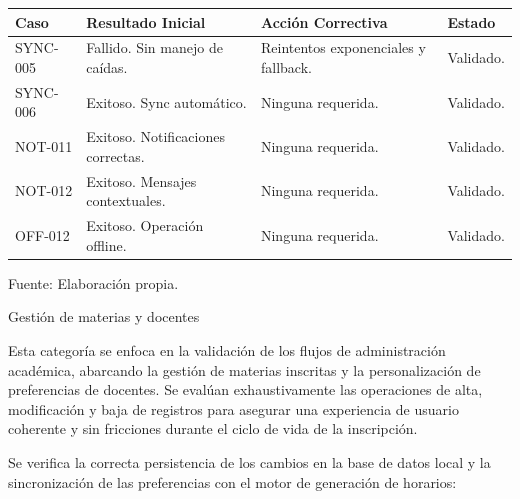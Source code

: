   \begin{center}
  \begin{minipage}{\linewidth}
  \centering
  \begin{tabularx}{\linewidth}{@{}>{\RaggedRight\arraybackslash}p{2.0cm}>{\RaggedRight\arraybackslash}X>{\RaggedRight\arraybackslash}X>{\RaggedRight\arraybackslash}p{1.8cm}@{}}
  \toprule
  Caso & Resultado Inicial & Acción Correctiva & Estado \\
  \midrule
  SYNC-005 & Fallido. Sin manejo de caídas. & Reintentos exponenciales y fallback. & Validado. \\
  \addlinespace
  SYNC-006 & Exitoso. Sync automático. & Ninguna requerida. & Validado. \\
  \addlinespace
  NOT-011 & Exitoso. Notificaciones correctas. & Ninguna requerida. & Validado. \\
  \addlinespace
  NOT-012 & Exitoso. Mensajes contextuales. & Ninguna requerida. & Validado. \\
  \addlinespace
  OFF-012 & Exitoso. Operación offline. & Ninguna requerida. & Validado. \\
  \bottomrule
  \end{tabularx}
  \label{tab:qa_sync}
  Fuente: Elaboración propia.
  \end{minipage}
  \end{center}
  
  \item Gestión de materias y docentes
  
  Esta categoría se enfoca en la validación de los flujos de administración académica, abarcando la gestión de materias inscritas y la personalización de preferencias de docentes. Se evalúan exhaustivamente las operaciones de alta, modificación y baja de registros para asegurar una experiencia de usuario coherente y sin fricciones durante el ciclo de vida de la inscripción.
  
  Se verifica la correcta persistencia de los cambios en la base de datos local y la sincronización de las preferencias con el motor de generación de horarios:
  
